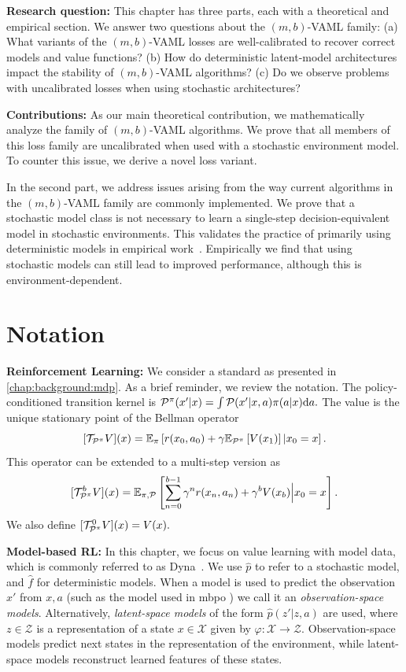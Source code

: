 \textbf{Research question:} This chapter has three parts, each with a theoretical and empirical section. We answer two questions about the $(m,b)$-VAML family: (a) What variants of the $(m,b)$-VAML losses are well-calibrated to recover correct models and value functions? (b) How do deterministic latent-model architectures impact the stability of $(m,b)$-VAML algorithms? (c) Do we observe problems with uncalibrated losses when using stochastic architectures?

\textbf{Contributions:} 
As our main theoretical contribution, we mathematically analyze the family of $(m,b)$-VAML algorithms.
We prove that all members of this loss family are uncalibrated when used with a stochastic environment model.
To counter this issue, we derive a novel loss variant.

In the second part, we address issues arising from the way current algorithms in the $(m,b)$-VAML family are commonly implemented.
We prove that a stochastic model class is not necessary to learn a single-step decision-equivalent model in stochastic environments.
This validates the practice of primarily using deterministic models in empirical work~\parencite{oh2017value,schrittwieser2020mastering,hansen2022temporal}.
Empirically we find that using stochastic models can still lead to improved performance, although this is environment-dependent.


\section{Notation}

\textbf{Reinforcement Learning:} We consider a standard as presented in \autoref{chap:background:mdp}.
As a brief reminder, we review the notation.
The policy-conditioned transition kernel is $\P^\pi(x'|x) = \int \P(x'|x,a) \pi(a|x) \mathrm{d} a.$
The value is the unique stationary point of the Bellman operator $$[\mathcal{T}_{\P^\pi} V](x) = \EEX{\pi}{r(x_0,a_0) + \gamma  \EEX{\P^\pi}{V(x_1)}|x_0=x}.$$
This operator can be extended to a multi-step version as $$[{\mathcal{T}}^b_{\P^\pi} V](x) = \EEX{\pi,\P}{\sum_{n=0}^{b-1} \gamma^n r(x_n,a_n) + \gamma^b {V(x_b)}\Big|x_0=x}.$$
We also define $[\mathcal{T}_{\P^\pi}^0 V](x) = V(x).$

\textbf{Model-based RL:} In this chapter, we focus on value learning with model data, which is commonly referred to as Dyna~\parencite{dyna}.
We use $\hat{p}$ to refer to a stochastic model, and $\hat{f}$ for deterministic models.
When a model is used to predict the observation $x'$ from $x,a$ (such as the model used in \ac{mbpo} \parencite{mbpo}) we call it an \emph{observation-space models}.
Alternatively, \emph{latent-space models} of the form $\hat{p}(z'|z, a)$ are used, where $z\in\mathcal{Z}$ is a representation of a state $x\in\mathcal{X}$ given by $\varphi: \mathcal{X} \rightarrow \mathcal{Z}$.
Observation-space models predict next states in the representation of the environment, while latent-space models reconstruct learned features of these states.

